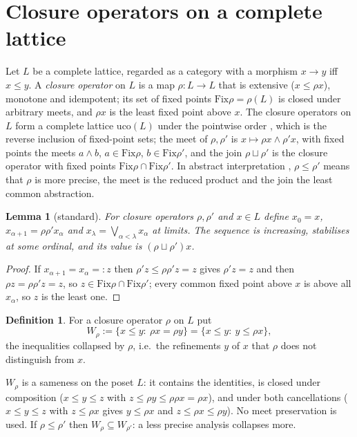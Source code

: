 \documentclass[11pt]{amsart}
\newtheorem{lem}[thm]{Lemma}
\theoremstyle{definition}
\newtheorem{defi}[thm]{Definition}
\newcommand{\Fix}{\mathrm{Fix}}
\newcommand{\uco}{\mathrm{uco}}
\begin{document}
\section{Closure operators on a complete lattice}\label{sec:lattice}

Let $L$ be a complete lattice, regarded as a category with a morphism
$x\to y$ iff $x\le y$. A \emph{closure operator} on $L$ is a map
$\rho\colon L\to L$ that is extensive ($x\le\rho x$), monotone and
idempotent; its set of fixed points $\Fix\rho=\rho(L)$ is closed under
arbitrary meets, and $\rho x$ is the least fixed point above $x$. The
closure operators on $L$ form a complete lattice $\uco(L)$ under the
pointwise order \cite{Ward}, which is the reverse inclusion of fixed-point
sets; the meet of $\rho,\rho'$ is $x\mapsto\rho x\wedge\rho'x$, with fixed
points the meets $a\wedge b$, $a\in\Fix\rho$, $b\in\Fix\rho'$, and the join
$\rho\sqcup\rho'$ is the closure operator with fixed points
$\Fix\rho\cap\Fix\rho'$. In abstract interpretation \cite{CC79,GR97},
$\rho\le\rho'$ means that $\rho$ is more precise, the meet is the reduced
product and the join the least common abstraction.

\begin{lem}[standard]\label{lem:iter}
For closure operators $\rho,\rho'$ and $x\in L$ define $x_0=x$,
$x_{\alpha+1}=\rho\rho'x_\alpha$ and $x_\lambda=\bigvee_{\alpha<\lambda}
x_\alpha$ at limits. The sequence is increasing, stabilises at some
ordinal, and its value is $(\rho\sqcup\rho')x$.
\end{lem}
\begin{proof}
If $x_{\alpha+1}=x_\alpha=:z$ then $\rho'z\le\rho\rho'z=z$ gives $\rho'z=z$
and then $\rho z=\rho\rho'z=z$, so $z\in\Fix\rho\cap\Fix\rho'$; every common
fixed point above $x$ is above all $x_\alpha$, so $z$ is the least one.
\end{proof}

\begin{defi}
For a closure operator $\rho$ on $L$ put
\[
W_\rho:=\{x\le y:\ \rho x=\rho y\}=\{x\le y:\ y\le\rho x\},
\]
the inequalities collapsed by $\rho$, i.e.\ the refinements $y$ of $x$
that $\rho$ does not distinguish from $x$.
\end{defi}

$W_\rho$ is a sameness on the poset $L$: it contains the identities, is
closed under composition ($x\le y\le z$ with $z\le\rho y\le\rho\rho x=\rho
x$), and under both cancellations ($x\le y\le z$ with $z\le\rho x$ gives
$y\le\rho x$ and $z\le\rho x\le\rho y$). No meet preservation is used. If
$\rho\le\rho'$ then $W_\rho\subseteq W_{\rho'}$: a less precise analysis
collapses more.
\end{document}
